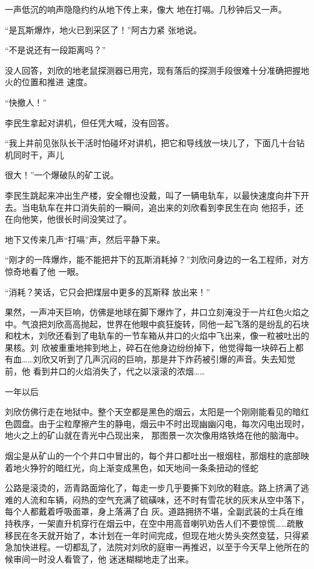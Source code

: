 \documentclass{article}
\begin{document}
一声低沉的响声隐隐约约从地下传上来，像大
地在打嗝。几秒钟后又一声。 

“是瓦斯爆炸，地火已到采区了！”阿古力紧
张地说。 


“不是说还有一段距离吗？” 

没人回答，刘欣的地老鼠探测器已用完，现有落后的探测手段很难十分准确把握地火的位置和推进
速度。 


“快撤人！” 

李民生拿起对讲机，但任凭大喊，没有回答。

“我上井前见张队长干活时怕碰坏对讲机，把它和导线放一块儿了，下面几十台钻机同时干，声儿
\newpage

很大！”一个爆破队的矿工说。 

李民生跳起来冲出生产楼，安全帽也没戴，叫了一辆电轨车，以最快速度向井下开去。当电轨车在井口消失前的一瞬间，追出来的刘欣看到李民生在向
他招手，还在向他笑，他很长时间没笑过了。 

地下又传来几声“打嗝”声，然后平静下来。

“刚才的一阵爆炸，能不能把井下的瓦斯消耗掉？”刘欣问身边的一名工程师，对方惊奇地看了他
一眼。 

“消耗？笑话，它只会把煤层中更多的瓦斯释
放出来！” 

果然，一声冲天巨响，仿佛是地球在脚下爆炸了，井口立刻淹没于一片红色火焰之中。气浪把刘欣高高抛起，世界在他眼中疯狂旋转，同他一起飞落的是纷乱的石块和枕木，刘欣还看到了电轨车的一节车箱从井口的火焰中飞出来，像一粒被吐出的果核。刘
\newpage
欣被重重地摔到地上，碎石在他身边纷纷掉下，他觉得每一块碎石上都有血……刘欣又听到了几声沉闷的巨响，那是井下炸药被引爆的声音。失去知觉前，他
看到井口的火焰消失了，代之以滚滚的浓烟…… 


一年以后 

刘欣仿佛行走在地狱中。整个天空都是黑色的烟云，太阳是一个刚刚能看见的暗红色圆盘。由于尘粒摩擦产生的静电，烟云中不时出现幽幽闪电，每次闪电出现时，地火之上的矿山就在青光中凸现出来，
那图景一次次像用烙铁烙在他的脑海中。 

烟尘是从矿山的一个个井口中冒出的，每个井口都吐出一根烟柱，那烟柱的底部映着地火狰狞的暗红光，向上渐变成黑色，如天地间一条条扭动的怪蛇

公路是滚烫的，沥青路面熔化了，每走一步几乎要撕下刘欣的鞋底。路上挤满了逃难的人流和车辆，闷热的空气充满了硫磺味，还不时有雪花状的灰末从空中落下，每个人都戴着呼吸面罩，身上落满了白
\newpage
灰。道路拥挤不堪，全副武装的士兵在维持秩序，一架直升机穿行在烟云中，在空中用高音喇叭劝告人们不要惊慌……疏散移民在冬天就开始了，本计划在一年时间完成，但现在地火势头突然变猛，只得紧急加快进程。一切都乱了，法院对刘欣的庭审一再推迟，以至于今天早上他所在的候审间一时没人看管了，他
迷迷糊糊地走了出来。 
\end{document}
